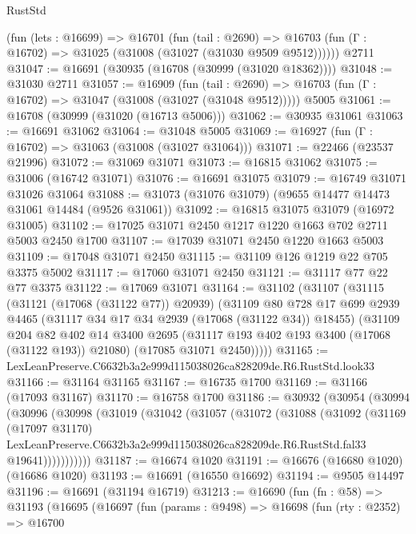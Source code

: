 \begin{lexlean}{RustStd}
\begin{coremodule}
    (fun (lets : @16699) =>
    @16701
      (fun (tail : @2690) =>
      @16703 (fun (Γ : @16702) => @31025 (@31008 (@31027 (@31030 @9509 @9512))))))
    @2711
@31047 := @16691 (@30935 (@16708 (@30999 (@31020 @18362))))
@31048 := @31030 @2711
@31057 := @16909
    (fun (tail : @2690) => @16703 (fun (Γ : @16702) => @31047 (@31008 (@31027 (@31048 @9512)))))
    @5005
@31061 := @16708 (@30999 (@31020 (@16713 @5006)))
@31062 := @30935 @31061
@31063 := @16691 @31062
@31064 := @31048 @5005
@31069 := @16927 (fun (Γ : @16702) => @31063 (@31008 (@31027 @31064)))
@31071 := @22466 (@23537 @21996)
@31072 := @31069 @31071
@31073 := @16815 @31062
@31075 := @31006 (@16742 @31071)
@31076 := @16691 @31075
@31079 := @16749 @31071 @31026 @31064
@31088 := @31073 (@31076 @31079) (@9655 @14477 @14473 @31061 @14484 (@9526 @31061))
@31092 := @16815 @31075 @31079 (@16972 @31005)
@31102 := @17025 @31071 @2450 @1217 @1220 @1663 @702 @2711 @5003 @2450 @1700
@31107 := @17039 @31071 @2450 @1220 @1663 @5003
@31109 := @17048 @31071 @2450
@31115 := @31109 @126 @1219 @22 @705 @3375 @5002
@31117 := @17060 @31071 @2450
@31121 := @31117 @77 @22 @77 @3375
@31122 := @17069 @31071
@31164 := @31102
    (@31107
      (@31115
        (@31121 (@17068 (@31122 @77)) @20939)
        (@31109
          @80
          @728
          @17
          @699
          @2939
          @4465
          (@31117 @34 @17 @34 @2939 (@17068 (@31122 @34)) @18455)
          (@31109
            @204
            @82
            @402
            @14
            @3400
            @2695
            (@31117 @193 @402 @193 @3400 (@17068 (@31122 @193)) @21080)
            (@17085 @31071 @2450)))))
@31165 := LexLeanPreserve.C6632b3a2e999d115038026ca828209de.R6.RustStd.look33
@31166 := @31164 @31165
@31167 := @16735 @1700
@31169 := @31166 (@17093 @31167)
@31170 := @16758 @1700
@31186 := @30932
    (@30954
      (@30994
        (@30996
          (@30998
            (@31019
              (@31042
                (@31057
                  (@31072
                    (@31088
                      (@31092
                        (@31169
                          (@17097 @31170)
                          LexLeanPreserve.C6632b3a2e999d115038026ca828209de.R6.RustStd.fal33
                          @19641)))))))))))
@31187 := @16674 @1020
@31191 := @16676 (@16680 @1020) (@16686 @1020)
@31193 := @16691 (@16550 @16692)
@31194 := @9505 @14497
@31196 := @16691 (@31194 @16719)
@31213 := @16690
    (fun (fn : @58) =>
    @31193
      (@16695
        (@16697
          (fun (params : @9498) =>
          @16698
            (fun (rty : @2352) =>
            @16700

\end{coremodule}
\end{lexlean}
